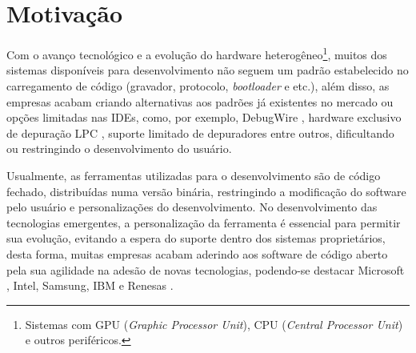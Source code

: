 \section{Motivação}

Com o avanço tecnológico e a evolução do hardware heterogêneo\footnote{Sistemas com GPU (\textit{Graphic Processor Unit}), CPU (\textit{Central Processor Unit}) e outros periféricos.}, muitos dos sistemas disponíveis para desenvolvimento não seguem um padrão estabelecido no carregamento de código (gravador, protocolo, \textit{bootloader} e etc.), além disso, as empresas acabam criando alternativas aos padrões já
 existentes no mercado ou opções limitadas nas IDEs, como, por exemplo, DebugWire \cite{debugwire}, hardware exclusivo de depuração LPC \cite{nxp}, suporte limitado de depuradores \cite{kiledebug} entre outros, dificultando ou restringindo o desenvolvimento do usuário.

Usualmente, as ferramentas utilizadas para o desenvolvimento são de código fechado, distribuídas numa versão binária, restringindo a modificação do software pelo usuário e personalizações do desenvolvimento. No desenvolvimento das tecnologias emergentes, a personalização da ferramenta é essencial para permitir sua evolução, evitando a espera do suporte dentro dos sistemas proprietários, desta forma, muitas empresas acabam aderindo aos software de código aberto pela sua agilidade na adesão de novas tecnologias, podendo-se destacar Microsoft \cite{microsoftn1}, Intel, Samsung, IBM e Renesas \cite{topskernel}.


\iffalse
\subsubsection{Ferramentas proprietárias}

Pela falta de um padrão definido, muitas empresas resolveram criar seus próprios, fundamentados em seus interesses ou na suas definições de utilização do que deveria ou não conter em suas soluções. Como consequência disso, são criados visões limitadas da realidade, resultante do modo de atuação interno vivida pela empresa, pela sua falta de conhecimento da realidade atual do mercado e suas utilizações.

Como consequência disso, a gama de padrões de protocolos de comunicação, \textit{bootloaders}, ICSPs, compiladores e outros materiais utilizados no desenvolvimento de sistemas embarcados, dificulta a realização do trabalho do desenvolvedor, principalmente se tais periféricos utilizados tem documentação e código fonte fechados, não permitindo seu conhecimento de funcionamento.
\fi

